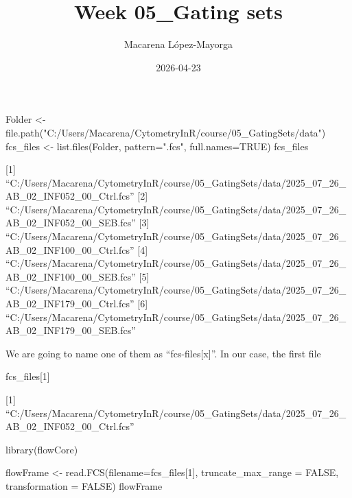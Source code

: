\documentclass[
  letterpaper,
  DIV=11,
  numbers=noendperiod]{scrartcl}
\title{Week 05\_Gating sets}
\author{Macarena López-Mayorga}
\date{2026-04-23}
\newenvironment{Shaded}{\begin{snugshade}}{\end{snugshade}}
\newcommand{\AttributeTok}[1]{\textcolor[rgb]{0.40,0.45,0.13}{#1}}
\newcommand{\ConstantTok}[1]{\textcolor[rgb]{0.56,0.35,0.01}{#1}}
\newcommand{\DecValTok}[1]{\textcolor[rgb]{0.68,0.00,0.00}{#1}}
\newcommand{\FunctionTok}[1]{\textcolor[rgb]{0.28,0.35,0.67}{#1}}
\newcommand{\NormalTok}[1]{\textcolor[rgb]{0.00,0.23,0.31}{#1}}
\newcommand{\OtherTok}[1]{\textcolor[rgb]{0.00,0.23,0.31}{#1}}
\newcommand{\StringTok}[1]{\textcolor[rgb]{0.13,0.47,0.30}{#1}}
\begin{document}
\maketitle


\begin{Shaded}
\begin{Highlighting}[]
\NormalTok{Folder }\OtherTok{\textless{}{-}} \FunctionTok{file.path}\NormalTok{(}\StringTok{"C:/Users/Macarena/CytometryInR/course/05\_GatingSets/data"}\NormalTok{)}
\NormalTok{fcs\_files }\OtherTok{\textless{}{-}} \FunctionTok{list.files}\NormalTok{(Folder, }\AttributeTok{pattern=}\StringTok{".fcs"}\NormalTok{, }\AttributeTok{full.names=}\ConstantTok{TRUE}\NormalTok{)}
\NormalTok{fcs\_files}
\end{Highlighting}
\end{Shaded}

{[}1{]}
``C:/Users/Macarena/CytometryInR/course/05\_GatingSets/data/2025\_07\_26\_AB\_02\_INF052\_00\_Ctrl.fcs''
{[}2{]}
``C:/Users/Macarena/CytometryInR/course/05\_GatingSets/data/2025\_07\_26\_AB\_02\_INF052\_00\_SEB.fcs''
{[}3{]}
``C:/Users/Macarena/CytometryInR/course/05\_GatingSets/data/2025\_07\_26\_AB\_02\_INF100\_00\_Ctrl.fcs''
{[}4{]}
``C:/Users/Macarena/CytometryInR/course/05\_GatingSets/data/2025\_07\_26\_AB\_02\_INF100\_00\_SEB.fcs''
{[}5{]}
``C:/Users/Macarena/CytometryInR/course/05\_GatingSets/data/2025\_07\_26\_AB\_02\_INF179\_00\_Ctrl.fcs''
{[}6{]}
``C:/Users/Macarena/CytometryInR/course/05\_GatingSets/data/2025\_07\_26\_AB\_02\_INF179\_00\_SEB.fcs''

We are going to name one of them as ``fcs-files{[}x{]}''. In our case,
the first file

\begin{Shaded}
\begin{Highlighting}[]
\NormalTok{fcs\_files[}\DecValTok{1}\NormalTok{]}
\end{Highlighting}
\end{Shaded}

{[}1{]}
``C:/Users/Macarena/CytometryInR/course/05\_GatingSets/data/2025\_07\_26\_AB\_02\_INF052\_00\_Ctrl.fcs''

\begin{Shaded}
\begin{Highlighting}[]
\FunctionTok{library}\NormalTok{(flowCore)}
\end{Highlighting}
\end{Shaded}

\begin{Shaded}
\begin{Highlighting}[]
\NormalTok{flowFrame }\OtherTok{\textless{}{-}} \FunctionTok{read.FCS}\NormalTok{(}\AttributeTok{filename=}\NormalTok{fcs\_files[}\DecValTok{1}\NormalTok{], }\AttributeTok{truncate\_max\_range =} \ConstantTok{FALSE}\NormalTok{, }\AttributeTok{transformation =} \ConstantTok{FALSE}\NormalTok{)}
\NormalTok{flowFrame}
\end{Highlighting}
\end{Shaded}
\end{document}
